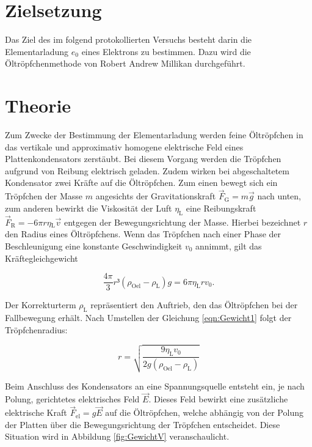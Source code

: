 



\section{Zielsetzung}
\label{sec:Zielsetzung}

Das Ziel des im folgend protokollierten Versuchs besteht darin die Elementarladung $e_0$ eines Elektrons
zu bestimmen. Dazu wird die Öltröpfchenmethode von Robert Andrew Millikan durchgeführt.

\section{Theorie}
\label{sec:Theorie}

Zum Zwecke der Bestimmung der Elementarladung werden feine Öltröpfchen in das vertikale und approximativ 
homogene elektrische Feld eines Plattenkondensators zerstäubt. Bei diesem Vorgang werden die Tröpfchen
aufgrund von Reibung elektrisch geladen. Zudem wirken bei abgeschaltetem Kondensator zwei Kräfte auf die 
Öltröpfchen. Zum einen bewegt sich ein Tröpfchen der Masse $m$ angesichts der Gravitationskraft
$\vec{F}_\text{G} = m\vec{g}$ nach unten, zum anderen bewirkt die Viskosität der Luft $\eta_\text{L}$ eine 
Reibungskraft $\vec{F}_\text{R} = -6\pi{}r\eta{}_\text{L}\vec{v}$ entgegen der Bewegungsrichtung der Masse. 
Hierbei bezeichnet $r$ den Radius eines Öltröpfchens. Wenn das Tröpfchen nach einer Phase der Beschleunigung 
eine konstante Geschwindigkeit $v_0$ annimmt, gilt das Kräftegleichgewicht

\begin{equation}
\label{eqn:Gewicht1}
    \frac{4\pi}{3}r³\left(\rho_\text{Oel}-\rho_\text{L}\right)g = 6\pi{}\eta_\text{L}rv_0.
\end{equation}

\noindent Der Korrekturterm $\rho_\text{L}$ repräsentiert den Auftrieb, den das Öltröpfchen bei der
Fallbewegung erhält. Nach Umstellen der Gleichung \eqref{eqn:Gewicht1} folgt der Tröpfchenradius:

\begin{equation*}
    r = \sqrt{\frac{9\eta_\text{L}v_0}{2g\left(\rho_\text{Oel}-\rho_\text{L}\right)}}
\end{equation*}

\noindent Beim Anschluss des Kondensators an eine Spannungsquelle entsteht ein, je nach Polung, gerichtetes 
elektrisches Feld $\vec{E}$. Dieses Feld bewirkt eine zusätzliche elektrische Kraft $\vec{F}_\text{el} = g\vec{E}$
auf die Öltröpfchen, welche abhängig von der Polung der Platten über die Bewegungsrichtung der Tröpfchen entscheidet.
Diese Situation wird in Abbildung \ref{fig:GewichtV} veranschaulicht.

